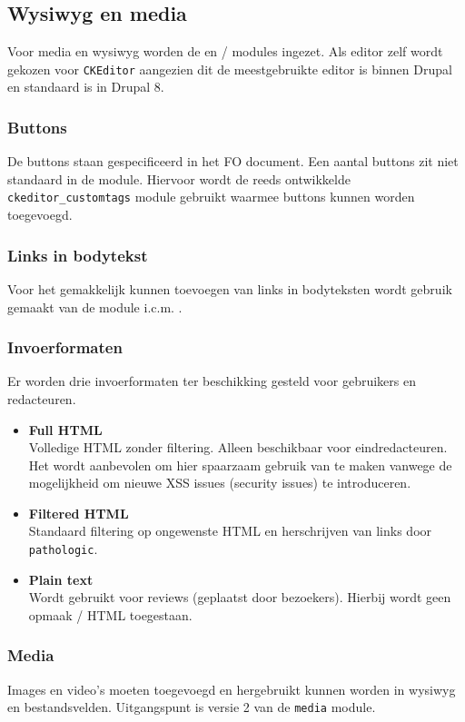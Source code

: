 \subsection{Wysiwyg en media}\label{wysiwyg}

Voor media en wysiwyg worden de  en  /  modules ingezet. Als editor zelf wordt gekozen voor \texttt{CKEditor} aangezien dit de meestgebruikte editor is binnen Drupal en standaard is in Drupal 8.

\subsubsection{Buttons}

De buttons staan gespecificeerd in het FO document.
Een aantal buttons zit niet standaard in de  module. Hiervoor wordt de reeds ontwikkelde \texttt{ckeditor\_customtags} module gebruikt waarmee buttons kunnen worden toegevoegd.

\subsubsection{Links in bodytekst}

Voor het gemakkelijk kunnen toevoegen van links in bodyteksten wordt gebruik gemaakt van de  module i.c.m. .

\subsubsection{Invoerformaten}\label{invoerformaten}

Er worden drie invoerformaten ter beschikking gesteld voor gebruikers en redacteuren.

\begin{itemize}
\item \textbf{Full HTML} \\
Volledige HTML zonder filtering. Alleen beschikbaar voor eindredacteuren. Het wordt aanbevolen om hier spaarzaam gebruik van te maken vanwege de mogelijkheid om nieuwe XSS issues (security issues) te introduceren.
\item \textbf{Filtered HTML} \\
Standaard filtering op ongewenste HTML en herschrijven van links door \texttt{pathologic}.
\item \textbf{Plain text} \\
Wordt gebruikt voor reviews (geplaatst door bezoekers). Hierbij wordt geen opmaak / HTML toegestaan.
\end{itemize}

\subsubsection{Media}\label{media}

Images en video's moeten toegevoegd en hergebruikt kunnen worden in wysiwyg en bestandsvelden.
Uitgangspunt is versie 2 van de \texttt{media} module.


